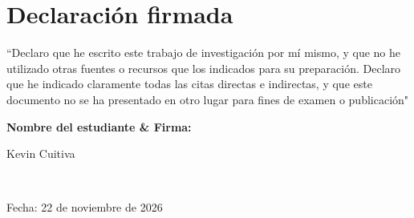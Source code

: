 \newcommand*\wildcard[2][6cm]{\vspace{2cm}\parbox{#1}{\hrulefill\par#2}} 

\section*{Declaración firmada}

\vspace{1cm}

“Declaro que he escrito este trabajo de investigación por mí mismo, y que no he utilizado otras fuentes o recursos que los indicados para su preparación. Declaro que he indicado claramente todas las citas directas e indirectas, y que este documento no se ha presentado en otro lugar para fines de examen o publicación"

\vspace{3cm}
\textbf{Nombre del estudiante \& Firma:}
\vspace{1cm}

\begingroup

    \begin{center}
        \wildcard{\centerline{Kevin Cuitiva} ~\\ \centerline{Fecha: 22 de noviembre de 2026}}
    \end{center}

\endgroup


\pagebreak